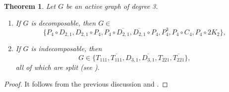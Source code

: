 \documentclass[11pt]{article}
\newtheorem{theorem}{Theorem}[section]
\newtheorem{lemma}[lemma]{Lemma}
\begin{document}
%
%

\begin{theorem}
	\label{clasificacion.activo_deg=3}
	Let $G$ be an active graph of degree 3.
	\begin{enumerate}
		\item If $G$ is decomposable, then $G \in$ \[ \{P_4 \circ D_{2,1}, D_{2,1} \circ P_4, P_4 \circ \overline{D_{2,1}}, \overline{D_{2,1}} \circ P_4, P_4^3, P_4 \circ C_4, P_4 \circ 2K_2\}, \]
		\item If $G$ is indecomposable, then
		\[ G \in \{T_{111}, \overline{T_{111}}, D_{3,1}, \overline{D_{3,1}}, T_{221}, \overline{T_{221}}\}, \]
		all of which are split (see  ).
	\end{enumerate}
\end{theorem}

\begin{proof}
	It follows from the previous discussion and .
\end{proof}
\end{document}

